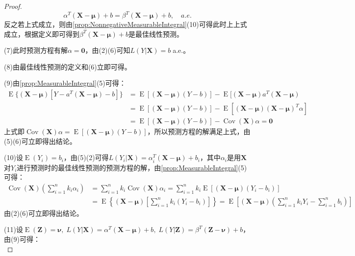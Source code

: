 \begin{proof}
	\begin{equation*}
		\alpha^T(\mathbf{X}-\boldsymbol{\mu})+b=\beta^T(\mathbf{X}-\boldsymbol{\mu})+b,\quad a.e.
	\end{equation*}
	反之若上式成立，则由\cref{prop:NonnegativeMeasurableIntegral}(10)可得此时上上式成立，根据定义即可得到$\beta^T(\mathbf{X}-\boldsymbol{\mu})+b$是最佳线性预测。\par
	(7)此时预测方程有解$\alpha=\mathbf{0}$，由(2)(6)可知$L(Y|\mathbf{X})=b\;$a.e.。\par
	(8)由最佳线性预测的定义和(6)立即可得。\par
	(9)由\cref{prop:MeasurableIntegral}(5)可得：
	\begin{align*}
		\operatorname{E}\{(\mathbf{X}-\boldsymbol{\mu})[Y-a^T(\mathbf{X}-\boldsymbol{\mu})-b]\}&=\operatorname{E}[(\mathbf{X}-\boldsymbol{\mu})(Y-b)]-\operatorname{E}[(\mathbf{X}-\boldsymbol{\mu})a^T(\mathbf{X}-\boldsymbol{\mu}) \\
		&=\operatorname{E}[(\mathbf{X}-\boldsymbol{\mu})(Y-b)]-\operatorname{E}[(\mathbf{X}-\boldsymbol{\mu})(\mathbf{X}-\boldsymbol{\mu})^T\alpha] \\
		&=\operatorname{E}[(\mathbf{X}-\boldsymbol{\mu})(Y-b)]-\operatorname{Cov}(\mathbf{X})\alpha=\mathbf{0}
	\end{align*}
	上式即$\operatorname{Cov}(\mathbf{X})\alpha=\operatorname{E}[(\mathbf{X}-\boldsymbol{\mu})(Y-b)]$，所以预测方程的解满足上式，由(5)(6)可立即得出结论。\par
	(10)设$\operatorname{E}(Y_i)=b_i$，由(5)(2)可得$L(Y_i|\mathbf{X})=\alpha_i^T(\mathbf{X}-\boldsymbol{\mu})+b_i$，其中$\alpha_i$是用$\mathbf{X}$对$Y_i$进行预测时的最佳线性预测的预测方程的解，由\cref{prop:MeasurableIntegral}(5)可得：
	\begin{align*}
		\operatorname{Cov}(\mathbf{X})\left(\sum_{i=1}^{n}k_i\alpha_i\right)&=\sum_{i=1}^{n}k_i\operatorname{Cov}(\mathbf{X})\alpha_i=\sum_{i=1}^{n}k_i\operatorname{E}[(\mathbf{X}-\boldsymbol{\mu})(Y_i-b_i)] \\
		&=\operatorname{E}\left\{(\mathbf{X}-\boldsymbol{\mu})\left[\sum_{i=1}^{n}k_i(Y_i-b_i)\right]\right\} =\operatorname{E}\left[(\mathbf{X}-\boldsymbol{\mu})\left(\sum_{i=1}^{n}k_iY_i-\sum_{i=1}^{n}b_i\right)\right]
	\end{align*}
	由(2)(6)可立即得出结论。\par
	(11)设$\operatorname{E}(\mathbf{Z})=\boldsymbol{\nu},\;L(Y|\mathbf{X})=\alpha^T(\mathbf{X}-\boldsymbol{\mu})+b,\;L(Y|\mathbf{Z})=\beta^T(\mathbf{Z}-\boldsymbol{\nu})+b$，由(9)可得：
	\begin{equation*}

\end{equation*}
\end{proof}
